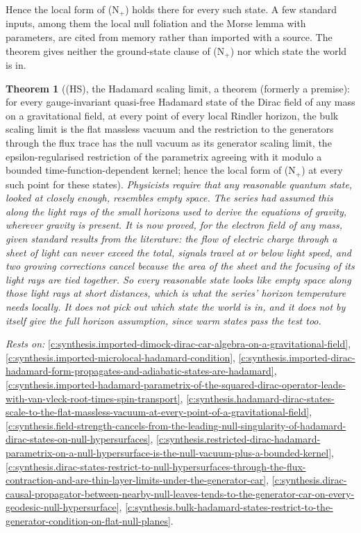 \documentclass[11pt]{article}
\newtheorem{theorem}{Theorem}[section]
\theoremstyle{definition}
\theoremstyle{plain}
\begin{document}
Hence the local form of (N$_{+}$) holds there for every such state. A few standard inputs, among them the local null foliation and the Morse lemma with parameters, are cited from memory rather than imported with a source. The theorem gives neither the ground-state clause of (N$_{+}$) nor which state the world is in.

\begin{theorem}[(HS), the Hadamard scaling limit, a theorem (formerly a premise): for every gauge-invariant quasi-free Hadamard state of the Dirac field of any mass on a gravitational field, at every point of every local Rindler horizon, the bulk scaling limit is the flat massless vacuum and the restriction to the generators through the flux trace has the null vacuum as its generator scaling limit, the epsilon-regularised restriction of the parametrix agreeing with it modulo a bounded time-function-dependent kernel; hence the local form of (N$_{+}$) at every such point for these states]\label{c:synthesis.hadamard-scaling-limit-premise}
Physicists require that any reasonable quantum state, looked at closely enough, resembles empty space. The series had assumed this along the light rays of the small horizons used to derive the equations of gravity, wherever gravity is present. It is now proved, for the electron field of any mass, given standard results from the literature: the flow of electric charge through a sheet of light can never exceed the total, signals travel at or below light speed, and two growing corrections cancel because the area of the sheet and the focusing of its light rays are tied together. So every reasonable state looks like empty space along those light rays at short distances, which is what the series' horizon temperature needs locally. It does not pick out which state the world is in, and it does not by itself give the full horizon assumption, since warm states pass the test too.
\end{theorem}
\noindent\emph{Rests on:} \ref{c:synthesis.imported-dimock-dirac-car-algebra-on-a-gravitational-field}, \ref{c:synthesis.imported-microlocal-hadamard-condition}, \ref{c:synthesis.imported-dirac-hadamard-form-propagates-and-adiabatic-states-are-hadamard}, \ref{c:synthesis.imported-hadamard-parametrix-of-the-squared-dirac-operator-leads-with-van-vleck-root-times-spin-transport}, \ref{c:synthesis.hadamard-dirac-states-scale-to-the-flat-massless-vacuum-at-every-point-of-a-gravitational-field}, \ref{c:synthesis.field-strength-cancels-from-the-leading-null-singularity-of-hadamard-dirac-states-on-null-hypersurfaces}, \ref{c:synthesis.restricted-dirac-hadamard-parametrix-on-a-null-hypersurface-is-the-null-vacuum-plus-a-bounded-kernel}, \ref{c:synthesis.dirac-states-restrict-to-null-hypersurfaces-through-the-flux-contraction-and-are-thin-layer-limits-under-the-generator-car}, \ref{c:synthesis.dirac-causal-propagator-between-nearby-null-leaves-tends-to-the-generator-car-on-every-geodesic-null-hypersurface}, \ref{c:synthesis.bulk-hadamard-states-restrict-to-the-generator-condition-on-flat-null-planes}.
\end{document}
